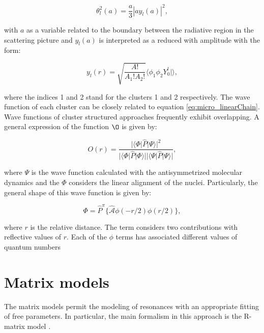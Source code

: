 \documentclass[openany]{book}
\begin{document}
\begin{equation}\label{eq:micro_linearChain_width}
	\theta^2_l (a) = \frac{a}{3} |a y_l(a)|^2,
\end{equation} 

with $a$ as a variable related to the boundary between the radiative region in the scattering picture and $y_l(a)$ is interpreted as a reduced with amplitude with the form: 

\begin{equation}\label{eq:micro_linearChain_widthAmplitude}
	y_l(r) = \sqrt{\frac{A!}{A_1!A_2! }} \langle \phi_1 \phi_2 Y^l_{0}| \rangle, 
\end{equation} 

where the indices 1 and 2 stand for the clusters 1 and 2 respectively. The wave function of each cluster can be closely related to equation \ref{eq:micro_linearChain}. \\

Wave functions of cluster structured approaches frequently exhibit overlapping. A general expression of the function $\O $ is given by:  

\begin{equation}\label{eq:micro_linearChain_overlapping}
	O(r) = \frac{|\langle \Phi | \hat P | \Psi \rangle |^2}{|\langle \Phi | \hat P | \Phi \rangle | |\langle \Psi | \hat P | \Psi \rangle |},
\end{equation} 

where $\Psi$ is the wave function calculated with the antisymmetrized molecular dynamics and the $\Phi$ considers the linear alignment of the nuclei. Particularly, the general shape of this wave function is given by: 

 \begin{equation}\label{eq:micro_linearChain_chainWaveFunction}
 	\Phi = \hat P^{\pi} \{ \hat {\mathcal{A}}  {\phi (-r/2)  \phi (r/2) } \},
 \end{equation} 

where $r$ is the relative distance. The term considers two contributions with reflective values of $r$. Each of the $\phi$ terms has associated different values of quantum numbers


\section{Matrix models}  \label{sec:matrixModels}

The matrix models permit the modeling of resonances with an appropriate fitting of free parameters. In particular, the main formalism in this approach is the R-matrix model \cite{lane_thomas_1958}. \\
\end{document}
